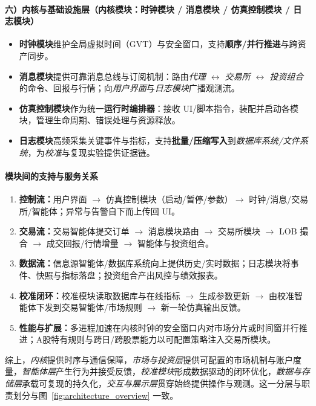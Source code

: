 \documentclass{mancls}
\begin{document}
\paragraph{六）内核与基础设施层（内核模块：时钟模块 / 消息模块 / 仿真控制模块 / 日志模块）}
\begin{itemize}
  \item \textbf{时钟模块}维护全局虚拟时间（GVT）与安全窗口，支持\textbf{顺序/并行推进}与跨资产同步。
  \item \textbf{消息模块}提供可靠消息总线与订阅机制：路由\emph{代理 $\leftrightarrow$ 交易所 $\leftrightarrow$ 投资组合}的命令、回报与行情；向\emph{用户界面}与\emph{日志模块}广播观测流。
  \item \textbf{仿真控制模块}作为统一\textbf{运行时编排器}：接收 UI/脚本指令，装配并启动各模块，管理生命周期、错误处理与资源释放。
  \item \textbf{日志模块}高频采集关键事件与指标，支持\textbf{批量/压缩写入}到\emph{数据库系统/文件系统}，为\emph{校准}与复现实验提供证据链。
\end{itemize}

\paragraph{模块间的支持与服务关系}
\begin{enumerate}
  \item \textbf{控制流：}用户界面 $\rightarrow$ 仿真控制模块（启动/暂停/参数）$\rightarrow$ 时钟/消息/交易所/智能体；异常与告警自下而上传回 UI。
  \item \textbf{交易流：}交易智能体提交订单 $\rightarrow$ 消息模块路由 $\rightarrow$ 交易所模块 $\rightarrow$ LOB 撮合 $\rightarrow$ 成交回报/行情增量 $\rightarrow$ 智能体与投资组合。
  \item \textbf{数据流：}信息源智能体/数据库系统向上提供历史/实时数据；日志模块将事件、快照与指标落盘；投资组合产出风控与绩效报表。
  \item \textbf{校准闭环：}校准模块读取数据库与在线指标 $\rightarrow$ 生成参数更新 $\rightarrow$ 由校准智能体下发到交易智能体/市场规则 $\rightarrow$ 新一轮仿真输出反馈。
  \item \textbf{性能与扩展：}多进程加速在内核时钟的安全窗口内对市场分片或时间窗并行推进；A股特有规则与跨日/跨股票能力以可配置策略注入交易所模块。
\end{enumerate}

综上，\emph{内核}提供时序与通信保障，\emph{市场与投资层}提供可配置的市场机制与账户度量，\emph{智能体层}产生行为并接受反馈，\emph{校准模块}形成数据驱动的闭环优化，\emph{数据与存储层}承载可复现的持久化，\emph{交互与展示层}贯穿始终提供操作与观测。这一分层与职责划分与图~\ref{fig:architecture_overview} 一致。
\end{document}
